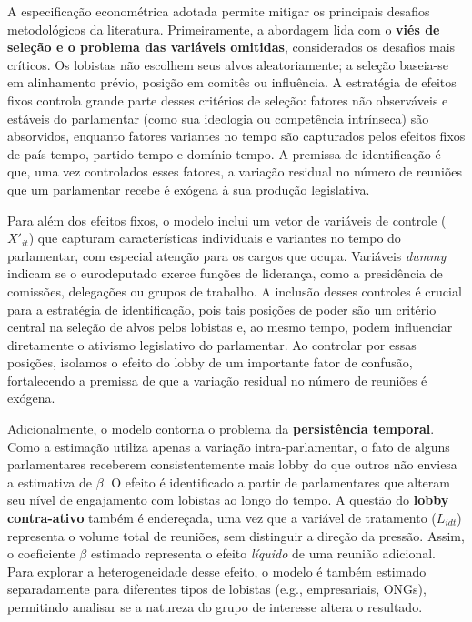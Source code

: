 A especificação econométrica adotada permite mitigar os principais desafios metodológicos da literatura. Primeiramente, a abordagem lida com o \textbf{viés de seleção e o problema das variáveis omitidas}, considerados os desafios mais críticos. Os lobistas não escolhem seus alvos aleatoriamente; a seleção baseia-se em alinhamento prévio, posição em comitês ou influência. A estratégia de efeitos fixos controla grande parte desses critérios de seleção: fatores não observáveis e estáveis do parlamentar (como sua ideologia ou competência intrínseca) são absorvidos, enquanto fatores variantes no tempo são capturados pelos efeitos fixos de país-tempo, partido-tempo e domínio-tempo. A premissa de identificação é que, uma vez controlados esses fatores, a variação residual no número de reuniões que um parlamentar recebe é exógena à sua produção legislativa.

Para além dos efeitos fixos, o modelo inclui um vetor de variáveis de controle ($X'_{it}$) que capturam características individuais e variantes no tempo do parlamentar, com especial atenção para os cargos que ocupa. Variáveis \textit{dummy} indicam se o eurodeputado exerce funções de liderança, como a presidência de comissões, delegações ou grupos de trabalho. A inclusão desses controles é crucial para a estratégia de identificação, pois tais posições de poder são um critério central na seleção de alvos pelos lobistas e, ao mesmo tempo, podem influenciar diretamente o ativismo legislativo do parlamentar. Ao controlar por essas posições, isolamos o efeito do lobby de um importante fator de confusão, fortalecendo a premissa de que a variação residual no número de reuniões é exógena.

Adicionalmente, o modelo contorna o problema da \textbf{persistência temporal}. Como a estimação utiliza apenas a variação intra-parlamentar, o fato de alguns parlamentares receberem consistentemente mais lobby do que outros não enviesa a estimativa de $\beta$. O efeito é identificado a partir de parlamentares que alteram seu nível de engajamento com lobistas ao longo do tempo. A questão do \textbf{lobby contra-ativo} também é endereçada, uma vez que a variável de tratamento ($L_{idt}$) representa o volume total de reuniões, sem distinguir a direção da pressão. Assim, o coeficiente $\beta$ estimado representa o efeito \textit{líquido} de uma reunião adicional. Para explorar a heterogeneidade desse efeito, o modelo é também estimado separadamente para diferentes tipos de lobistas (e.g., empresariais, ONGs), permitindo analisar se a natureza do grupo de interesse altera o resultado.

